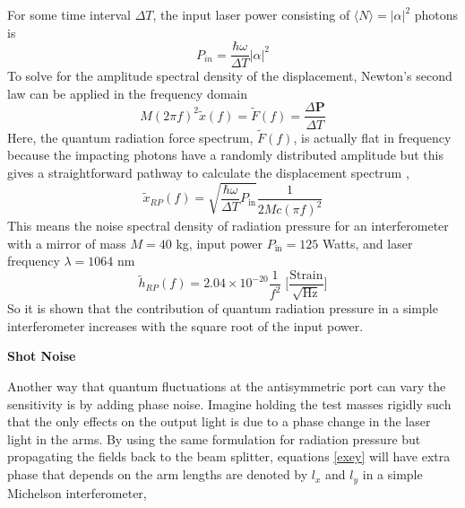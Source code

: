 		For some time interval $\Delta T$, the input laser power consisting of $\langle N \rangle =\vert\alpha \vert^2$ photons is
		\begin{equation}
		P_{in} = \frac{\hbar \omega}{\Delta T} \vert \alpha \vert^2
		\end{equation}
		To solve for the amplitude spectral density of the displacement, Newton's second law can be applied in the frequency domain
		\begin{equation}
		M (2\pi f)^2 \tilde{x}(f) = \tilde{F}(f) = \frac{\Delta \mathbf{P}}{\Delta T}
		\end{equation}
		Here, the quantum radiation force spectrum, $\tilde{F}(f)$, is actually flat in frequency because the impacting photons have a randomly distributed amplitude but this gives a straightforward pathway to calculate the displacement spectrum ,
		\begin{equation}
		\tilde{x}_{RP}(f) = \sqrt{\frac{\hbar \omega}{\Delta T} P_{\text{in}}} \frac{1}{2Mc (\pi f)^2}
		\end{equation}
		This means the noise spectral density of radiation pressure for an interferometer with a mirror of mass $M=40 $ kg, input power $P_{\text{in}}=125$ Watts, and laser frequency $\lambda=1064$ nm
		\begin{equation}
		\tilde{h}_{RP}(f) = 2.04\times 10^{-20} \frac{1}{f^2} \; \bigg[ \frac{\text{Strain}}{\sqrt{\text{Hz}}}\bigg]
		\end{equation}
		So it is shown that the contribution of quantum radiation pressure in a simple interferometer increases with the square root of the input power.
		
		\textbf{Shot Noise}
		
		Another way that quantum fluctuations at the antisymmetric port can vary the sensitivity is by adding phase noise.  Imagine holding the test masses rigidly such that the only effects on the output light is due to a phase change in the laser light in the arms. By using the same formulation for radiation pressure but propagating the fields back to the beam splitter, equations \ref{exey} will have extra phase that depends on the arm lengths are denoted by $l_x$ and $l_y$ in a simple Michelson interferometer,
		
